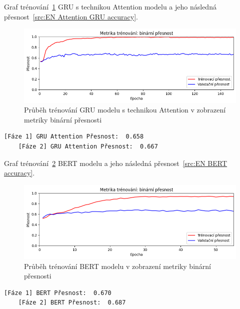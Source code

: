 Graf trénování~\ref{fig:EN Attention GRU model train} GRU s technikou Attention modelu a jeho následná přesnost~\ref{src:EN Attention GRU accuracy}.
\begin{figure}[H]
	\centering
	\includegraphics[width=1\textwidth]{Figures/EN_GRU_Attention_binarni_presnost.png}
	\caption{Průběh trénování GRU modelu s technikou Attention v zobrazení metriky binární přesnosti}\label{fig:EN Attention GRU model train}
\end{figure}
\begin{lstlisting}[label=src:EN Attention GRU accuracy, caption={Výsledek GRU modelu s technikou Attention na anglickém datasetu po trénování~\ref{fig:EN Attention GRU model train}}]
	[Fáze 1] GRU Attention Přesnost:  0.658
	[Fáze 2] GRU Attention Přesnost:  0.667
\end{lstlisting}

Graf trénování~\ref{fig:EN BERT model train} BERT modelu a jeho následná přesnost~\ref{src:EN BERT accuracy}.
\begin{figure}[H]
	\centering
	\includegraphics[width=1\textwidth]{Figures/EN_BERT_binarni_presnost.png}
	\caption{Průběh trénování BERT modelu v zobrazení metriky binární přesnosti}\label{fig:EN BERT model train}
\end{figure}
\begin{lstlisting}[label=src:EN BERT accuracy, caption={Výsledek BERT modelu na anglickém datasetu po trénování~\ref{fig:EN BERT model train}}]
	[Fáze 1] BERT Přesnost:  0.670
	[Fáze 2] BERT Přesnost:  0.687
\end{lstlisting}


